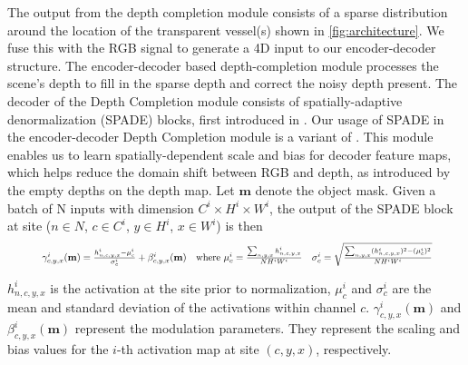 \documentclass{article}
\begin{document}
The output from the depth completion module consists of a sparse distribution around the location of the transparent vessel(s) shown in \autoref{fig:architecture}. We fuse this with the RGB signal to generate a 4D input to our encoder-decoder structure. The encoder-decoder based depth-completion module processes the scene's depth to fill in the sparse depth and correct the noisy depth present. The decoder of the Depth Completion module consists of spatially-adaptive denormalization (SPADE) blocks, first introduced in \citep{park2019semantic}. Our usage of SPADE in the encoder-decoder Depth Completion module is a variant of \citep{dmidc2020}. This module enables us to learn spatially-dependent scale and bias for decoder feature maps, which helps reduce the domain shift between RGB and depth, as introduced by the empty depths on the depth map. Let $\textbf{m}$ denote the object mask. Given a batch of N inputs with dimension $C^i \times H^i \times W^i$, the output of the SPADE block at site ($n \in N$, $c \in C^i$, $y \in H^i$, $x \in W^i$) is then 
\begin{equation}
    \resizebox{0.9\textwidth}{!}{
    $\gamma_{c,y,x}^i(\textrm{\textbf{m}}) = \frac{h^i_{n,c,y,x} - \mu_c^i}{\sigma_c^i} + \beta^i_{c,y,x}(\textrm{\textbf{m}})  \quad \textrm{where } \mu_c^i = \frac{\sum_{n,y,x} h^i_{n,c,y,x} }{N H^i W^i} \quad \sigma_c^i = \sqrt{\frac{\sum_{n,y,x} (h^i_{n,c,y,x})^2 - (\mu_c^i)^2}{N H^i W^i} }
    $}
\end{equation}

$h^i_{n,c,y,x}$ is the activation at the site prior to normalization, $\mu_c^i$ and $\sigma_c^i$ are the mean and standard deviation of the activations within channel $c$. $\gamma_{c,y,x}^i(\textbf{m})$ and $\beta^i_{c,y,x}(\textbf{m})$ represent the modulation parameters. They represent the scaling and bias values for the $i$-th activation map at site $(c,y,x)$, respectively.


\end{document}
